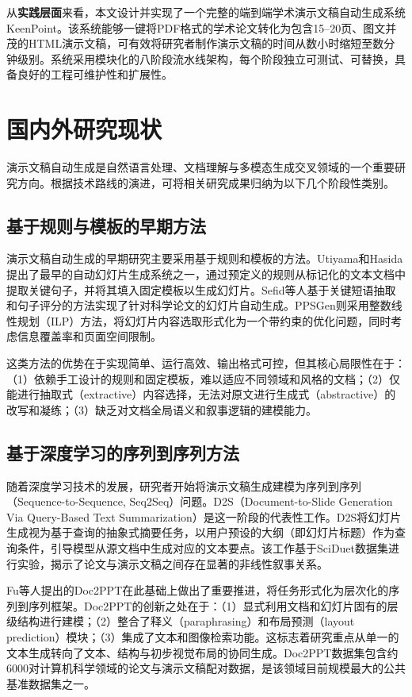 从\textbf{实践层面}来看，本文设计并实现了一个完整的端到端学术演示文稿自动生成系统KeenPoint。该系统能够一键将PDF格式的学术论文转化为包含15--20页、图文并茂的HTML演示文稿，可有效将研究者制作演示文稿的时间从数小时缩短至数分钟级别。系统采用模块化的八阶段流水线架构，每个阶段独立可测试、可替换，具备良好的工程可维护性和扩展性。

\section{国内外研究现状}

演示文稿自动生成是自然语言处理、文档理解与多模态生成交叉领域的一个重要研究方向。根据技术路线的演进，可将相关研究成果归纳为以下几个阶段性类别。

\subsection{基于规则与模板的早期方法}

演示文稿自动生成的早期研究主要采用基于规则和模板的方法。Utiyama和Hasida\cite{utiyama1999automatic}提出了最早的自动幻灯片生成系统之一，通过预定义的规则从标记化的文本文档中提取关键句子，并将其填入固定模板以生成幻灯片。Sefid等人\cite{sefid2019automatic}基于关键短语抽取和句子评分的方法实现了针对科学论文的幻灯片自动生成。PPSGen\cite{hu2015ppsgen}则采用整数线性规划（ILP）方法，将幻灯片内容选取形式化为一个带约束的优化问题，同时考虑信息覆盖率和页面空间限制。

这类方法的优势在于实现简单、运行高效、输出格式可控，但其核心局限性在于：（1）依赖手工设计的规则和固定模板，难以适应不同领域和风格的文档；（2）仅能进行抽取式（extractive）内容选择，无法对原文进行生成式（abstractive）的改写和凝练；（3）缺乏对文档全局语义和叙事逻辑的建模能力。

\subsection{基于深度学习的序列到序列方法}

随着深度学习技术的发展，研究者开始将演示文稿生成建模为序列到序列（Sequence-to-Sequence, Seq2Seq）问题。D2S（Document-to-Slide Generation Via Query-Based Text Summarization）\cite{sun2021d2s}是这一阶段的代表性工作。D2S将幻灯片生成视为基于查询的抽象式摘要任务，以用户预设的大纲（即幻灯片标题）作为查询条件，引导模型从源文档中生成对应的文本要点。该工作基于SciDuet数据集进行实验，揭示了论文与演示文稿之间存在显著的非线性叙事关系。

Fu等人提出的Doc2PPT\cite{fu2022doc2ppt}在此基础上做出了重要推进，将任务形式化为层次化的序列到序列框架。Doc2PPT的创新之处在于：（1）显式利用文档和幻灯片固有的层级结构进行建模；（2）整合了释义（paraphrasing）和布局预测（layout
prediction）模块；（3）集成了文本和图像检索功能。这标志着研究重点从单一的文本生成转向了文本、结构与初步视觉布局的协同生成。Doc2PPT数据集包含约6000对计算机科学领域的论文与演示文稿配对数据，是该领域目前规模最大的公共基准数据集之一。

